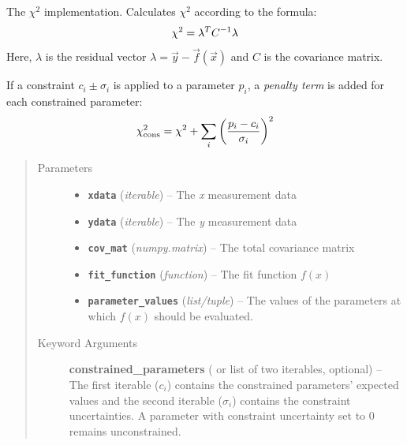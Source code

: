 \documentclass[a4paper,10pt,english]{sphinxmanual}
\begin{document}

\begin{fulllineitems}
\label{index:kafe.fit.chi2}
The \(\chi^2\) implementation. Calculates \(\chi^2\) according
to the formula:
\begin{gather}
\begin{split}\chi^2 = \lambda^T C^{-1} \lambda\end{split}\notag
\end{gather}
Here, \(\lambda\) is the residual vector \(\lambda = \vec{y} -
\vec{f}(\vec{x})\) and \(C\) is the covariance matrix.

If a constraint \(c_i\pm\sigma_i\) is applied to a parameter \(p_i\),
a \emph{penalty term} is added for each constrained parameter:
\begin{gather}
\begin{split}\chi^2_{\text{cons}} = \chi^2 + \sum_i{ \left( \frac{p_i - c_i}{\sigma_i} \right)^2 }\end{split}\notag
\end{gather}\begin{quote}\begin{description}
\item[{Parameters}] \leavevmode\begin{itemize}
\item {} 
\textbf{\texttt{xdata}} (\emph{iterable}) -- The \emph{x} measurement data

\item {} 
\textbf{\texttt{ydata}} (\emph{iterable}) -- The \emph{y} measurement data

\item {} 
\textbf{\texttt{cov\_mat}} (\emph{numpy.matrix}) -- The total covariance matrix

\item {} 
\textbf{\texttt{fit\_function}} (\emph{function}) -- The fit function \(f(x)\)

\item {} 
\textbf{\texttt{parameter\_values}} (\emph{list/tuple}) -- The values of the parameters at which \(f(x)\) should be evaluated.

\end{itemize}

\item[{Keyword Arguments}] \leavevmode
\textbf{constrained\_parameters} ( or list of two iterables, optional) --
The first iterable (\({c_i}\)) contains the constrained parameters'
expected values and the second iterable (\({\sigma_i}\)) contains
the constraint uncertainties. A parameter with constraint uncertainty
set to 0 remains unconstrained.

\end{description}\end{quote}

\end{fulllineitems}
\end{document}
